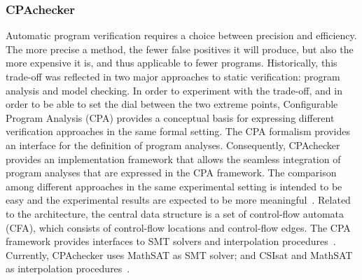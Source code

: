 \documentclass[review]{elsarticle}
\begin{document}
\subsubsection{CPAchecker}
Automatic program verification requires a choice between precision and efficiency. The more precise a method, the fewer false positives it will produce, but also the more expensive it is, and thus applicable to fewer programs. 
Historically, this trade-off was reflected in two major approaches to static verification: program analysis and model checking. In order to experiment with the trade-off, and in order to be able to set the dial between the two extreme points, Configurable Program Analysis (CPA) provides a conceptual basis for expressing different verification approaches in the same formal setting. The CPA formalism provides an interface for the definition of program analyses. Consequently, CPAchecker provides an implementation framework that allows the seamless integration of program analyses that are expressed in the CPA framework. The comparison among different approaches in the same experimental setting is intended to be easy and the experimental results are expected to be more meaningful~\citep{Beyer2011}. Related to the architecture, the central data structure is a set of control-flow automata (CFA), which consists of control-flow locations and control-flow edges. The CPA framework provides interfaces to SMT solvers and interpolation procedures~\citep{Beyer2011}. Currently, CPAchecker uses MathSAT as SMT solver; and CSIsat and MathSAT as interpolation procedures~\cite{Beyer2011}. %
\end{document}
